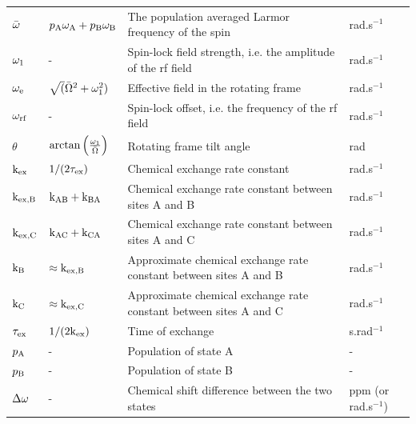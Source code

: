 \begin{table}
\begin{center}
\begin{longtable}{llll}
$\bar\omega$        & $p_\textrm{A}\omega_\textrm{A} + p_\textrm{B}\omega_\textrm{B}$      & The population averaged Larmor frequency of the spin                          & rad.s$^{-1}$ \\
$\omega_1$        & -                              & Spin-lock field strength, i.e. the amplitude of the rf field                  & rad.s$^{-1}$ \\
$\omega_\textrm{e}$          & $\sqrt(\bar\Omega^2 + \omega_1^2)$  & Effective field in the rotating frame                                   & rad.s$^{-1}$ \\
$\omega_\textrm{rf}$         & -                              & Spin-lock offset, i.e. the frequency of the rf field                          & rad.s$^{-1}$ \\
$\theta$           & $\arctan \left( \frac{\omega_1}{\bar\Omega} \right)$  & Rotating frame tilt angle                             & rad \\
$\textrm{k}_\textrm{ex}$             & $1 / (2 \tau_\textrm{ex})$                 & Chemical exchange rate constant                                               & rad.s$^{-1}$ \\
$\textrm{k}_\textrm{ex,B}$            & $\textrm{k}_\textrm{AB} + \textrm{k}_\textrm{BA}$                  & Chemical exchange rate constant between sites A and B                         & rad.s$^{-1}$ \\
$\textrm{k}_\textrm{ex,C}$            & $\textrm{k}_\textrm{AC} + \textrm{k}_\textrm{CA}$                  & Chemical exchange rate constant between sites A and C                         & rad.s$^{-1}$ \\
$\textrm{k}_\textrm{B}$              & $\approx \textrm{k}_\textrm{ex,B}$                & Approximate chemical exchange rate constant between sites A and B             & rad.s$^{-1}$ \\
$\textrm{k}_\textrm{C}$              & $\approx \textrm{k}_\textrm{ex,C}$                & Approximate chemical exchange rate constant between sites A and C             & rad.s$^{-1}$ \\
$\tau_\textrm{ex}$             & $1 / (2 \textrm{k}_\textrm{ex})$                 & Time of exchange                                                              & s.rad$^{-1}$ \\
$p_\textrm{A}$              & -                              & Population of state A                                                         & - \\
$p_\textrm{B}$              & -                              & Population of state B                                                         & - \\
$\Delta\omega$              & -                              & Chemical shift difference between the two states                              & ppm (or rad.s$^{-1}$) \\

\end{longtable}
\end{center}
\end{table}
